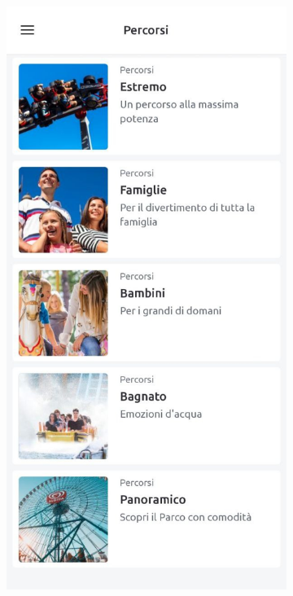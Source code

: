 \begin{figure}[H]
    \centering
    \begin{subfigure}[b]{0.35\textwidth}
        \centering
        \includegraphics[width=\textwidth]{img/miraPlan}

\end{subfigure}
\end{figure}
